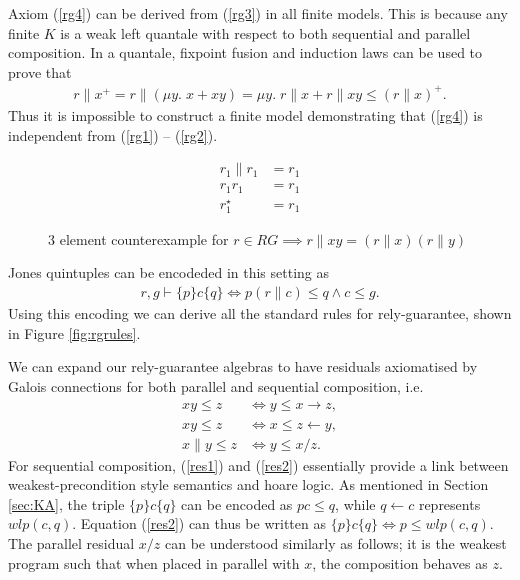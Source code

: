 \documentclass{llncs}
\begin{document}
Axiom (\ref{rg4}) can be derived from (\ref{rg3}) in all finite
models. This is because any finite $K$ is a weak left quantale with
respect to both sequential and parallel composition. In a quantale,
fixpoint fusion and induction laws can be used to prove that
\begin{align*}
r\|x^+ = r\|(\mu y.\; x + xy) = \mu y.\; r\|x + r\|xy \le (r\|x)^+.
\end{align*}
Thus it is impossible to construct a finite model demonstrating
that (\ref{rg4}) is independent from (\ref{rg1}) -- (\ref{rg2}).

\begin{figure}[t]
\centering
\begin{minipage}{0.24\textwidth}
\end{minipage}
\begin{minipage}{0.24\textwidth}
\begin{align*}
r_1 \| r_1 &= r_1\\
r_1 r_1 &= r_1\\
r_1^\star &= r_1
\end{align*}
\end{minipage}
\caption{3 element counterexample for $r \in RG \implies r\|xy = (r\|x)(r\|y)$}
\label{fig:rg3}
\end{figure}

Jones quintuples can be encodeded in this setting as
\begin{align}
r, g \vdash \{p\} c \{q\} \iff p(r\|c) \le q \land c \le g.
\end{align}
Using this encoding we can derive all the standard rules for
rely-guarantee, shown in Figure \ref{fig:rgrules}.

We can expand our rely-guarantee algebras to have residuals
axiomatised by Galois connections for both parallel and sequential
composition, i.e.
\begin{align}
xy \le z &\iff y \le x \rightarrow z, \label{res1}\\
xy \le z &\iff x \le z \leftarrow y, \label{res2}\\
x\|y \le z &\iff y \le x/z \label{res3}.
\end{align}
For sequential composition, (\ref{res1}) and (\ref{res2}) essentially
provide a link between weakest-precondition style semantics and hoare
logic. As mentioned in Section \ref{sec:KA}, the triple $\{p\} c
\{q\}$ can be encoded as $pc \le q$, while $q \leftarrow c$ represents
$wlp(c,q)$. Equation (\ref{res2}) can thus be written as $\{p\} c
\{q\} \iff p \le wlp(c,q)$. The parallel residual $x/z$ can be
understood similarly as follows; it is the weakest program such that
when placed in parallel with $x$, the composition behaves as $z$.
\end{document}
